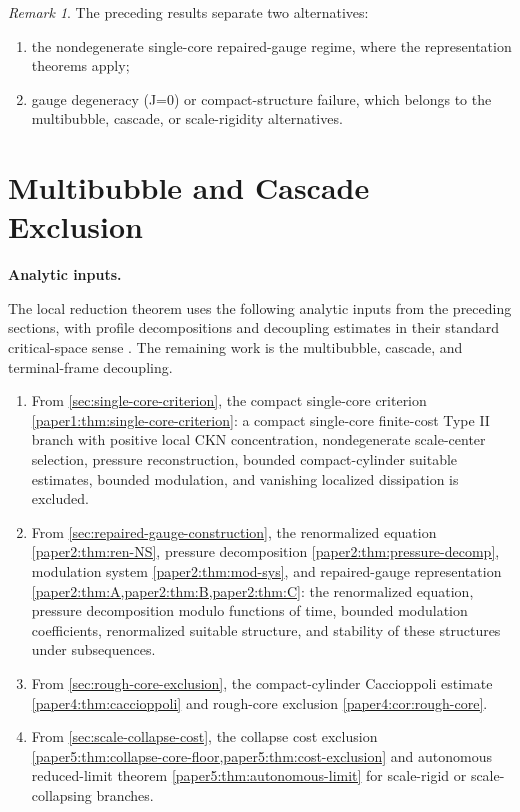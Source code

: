 \documentclass[11pt]{amsart}
\def\({}%
\def\){}%
\theoremstyle{plain}
\theoremstyle{definition}
\theoremstyle{remark}
\newtheorem{remark}[remark]{Remark}
\begin{document}
\begin{remark}
The preceding results separate two alternatives:
\begin{enumerate}
\item the nondegenerate single-core repaired-gauge regime, where the representation theorems apply;
\item gauge degeneracy (\(\det J=0\)) or compact-structure failure, which belongs
to the multibubble, cascade, or scale-rigidity alternatives.
\end{enumerate}
\end{remark}

\clearpage
\section{Multibubble and Cascade Exclusion}\label{sec:multibubble-cascade-exclusion}
\medskip
\noindent\textbf{Analytic inputs.}

The local reduction theorem uses the following analytic inputs from the
preceding sections, with profile decompositions and decoupling estimates in
their standard critical-space sense \cite{Gallagher2001,BrezisLieb1983}.  The
remaining work is the multibubble, cascade, and terminal-frame decoupling.
\begin{enumerate}[label=\textup{(\roman*)}]
\item From \cref{sec:single-core-criterion}, the compact single-core criterion \cref{paper1:thm:single-core-criterion}: a
compact single-core finite-cost Type II branch with positive local CKN
concentration, nondegenerate scale-center selection, pressure reconstruction,
bounded compact-cylinder suitable estimates, bounded modulation, and vanishing
localized dissipation is excluded.
\item From \cref{sec:repaired-gauge-construction}, the renormalized equation \cref{paper2:thm:ren-NS}, pressure decomposition \cref{paper2:thm:pressure-decomp}, modulation system \cref{paper2:thm:mod-sys}, and repaired-gauge representation \cref{paper2:thm:A,paper2:thm:B,paper2:thm:C}: the renormalized equation,
pressure decomposition modulo functions of time, bounded modulation
coefficients, renormalized suitable structure, and stability of these structures
under subsequences.
\item From \cref{sec:rough-core-exclusion}, the compact-cylinder Caccioppoli estimate \cref{paper4:thm:caccioppoli} and rough-core exclusion \cref{paper4:cor:rough-core}.
\item From \cref{sec:scale-collapse-cost}, the collapse cost exclusion \cref{paper5:thm:collapse-core-floor,paper5:thm:cost-exclusion} and autonomous reduced-limit theorem \cref{paper5:thm:autonomous-limit} for scale-rigid or scale-collapsing branches.
\end{enumerate}
\end{document}
